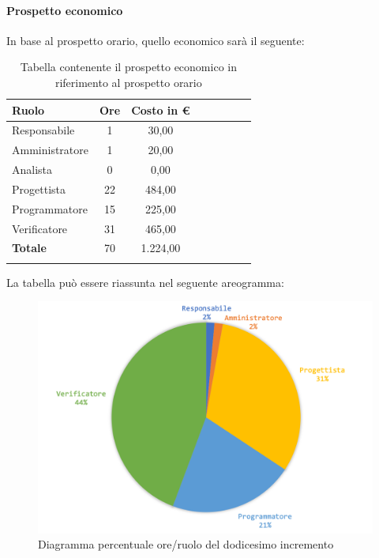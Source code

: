 		\paragraph{Prospetto economico}
		In base al prospetto orario, quello economico sarà il seguente: 
		
		\begin{longtable}{|l|c|c|c|c|c|c|c|}
			\hline
			\rowcolor{lighter-grayer}
			\textbf{Ruolo} & \textbf{Ore} & \textbf{Costo in € } \\
			\hline
			\endfirsthead
			
			\hline
			Responsabile 	    & 1 & 30,00\\
			\hline 
			\hline
			Amministratore	   & 1 & 20,00\\
			\hline
			\hline
			Analista 				& 0 & 0,00\\
			\hline
			\hline
			Progettista 		   & 22 & 484,00\\
			\hline
			\hline
			Programmatore 	  & 15 & 225,00\\
			\hline
			\hline
			Verificatore 		   & 31 & 465,00\\
			\hline
			\textbf{Totale} 	 & 70 & 1.224,00\\
			\hline
			\caption{Tabella contenente il prospetto economico in riferimento al prospetto orario}
		\end{longtable}
		
		La tabella può essere riassunta nel seguente areogramma:
		\begin{figure}[H]
			\centering
			\includegraphics[width=0.8\linewidth]{./images/preventivo/incremento12-2.png}
			\caption{Diagramma percentuale ore/ruolo del dodicesimo incremento}
			\label{fig:diagramma costi ruolo incremento XII}
		\end{figure}
		\pagebreak
	
